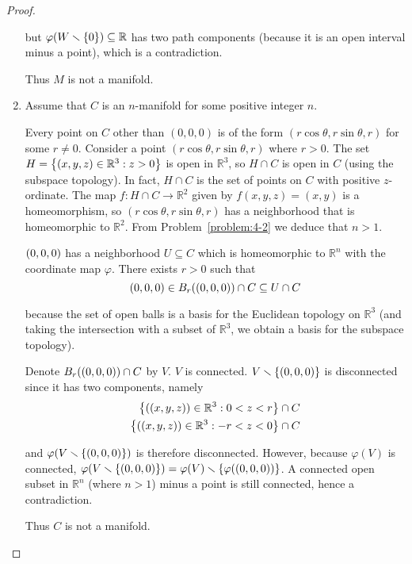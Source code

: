 \begin{proof}
\begin{enumerate}[label={(\alph*)}]
		      but $\varphi(W\smallsetminus\left\{{0}\right\}) \subseteq \mathbb{R}$ has two path components (because it is an open interval minus a point), which is a contradiction.

		      Thus $M$ is not a manifold.
		\item Assume that $C$ is an $n$-manifold for some positive integer $n$.

		      Every point on $C$ other than $(0, 0, 0)$ is of the form $(r\cos\theta, r\sin\theta, r)$ for some $r\ne 0$. Consider a point $(r\cos\theta, r\sin\theta, r)$ where $r > 0$. The set $H = \left\{{ \left({x, y, z}\right) \in \mathbb{R}^{3} : z > 0 }\right\}$ is open in $\mathbb{R}^{3}$, so $H \cap C$ is open in $C$ (using the subspace topology). In fact, $H\cap C$ is the set of points on $C$ with positive $z$-ordinate. The map $f: H\cap C \to \mathbb{R}^{2}$ given by $f(x, y, z) = (x, y)$ is a homeomorphism, so $(r\cos\theta, r\sin\theta, r)$ has a neighborhood that is homeomorphic to $\mathbb{R}^{2}$. From Problem~\ref{problem:4-2} we deduce that $n > 1$.

		      $\left({0, 0, 0}\right)$ has a neighborhood $U \subseteq C$ which is homeomorphic to $\mathbb{R}^{n}$ with the coordinate map $\varphi$. There exists $r > 0$ such that
		      \begin{equation*}
			      \left({0,0,0}\right) \in B_{r}(\left({0,0,0}\right)) \cap C \subseteq U \cap C
		      \end{equation*}

		      because the set of open balls is a basis for the Euclidean topology on $\mathbb{R}^{3}$ (and taking the intersection with a subset of $\mathbb{R}^{3}$, we obtain a basis for the subspace topology).

		      Denote $B_{r}(\left({0,0,0}\right)) \cap C$ by $V$. $V$ is connected. $V\smallsetminus\left\{{\left({0,0,0}\right)}\right\}$ is disconnected since it has two components, namely
		      \begin{equation*}
			      \begin{split}
				      \left\{{\left({(x, y, z)}\right) \in \mathbb{R}^{3} : 0 < z < r}\right\} \cap C \\
				      \left\{{\left({(x, y, z)}\right) \in \mathbb{R}^{3} : -r < z < 0}\right\} \cap C
			      \end{split}
		      \end{equation*}

		      and $\varphi(V \smallsetminus \left\{{\left({0,0,0}\right)}\right\})$ is therefore disconnected. However, because $\varphi(V)$ is connected, $\varphi(V \smallsetminus \left\{{\left({0,0,0}\right)}\right\}) = \varphi(V) \smallsetminus\left\{{\varphi(\left({0,0,0}\right))}\right\}$. A connected open subset in $\mathbb{R}^{n}$ (where $n > 1$) minus a point is still connected, hence a contradiction.

		      Thus $C$ is not a manifold.
	\end{enumerate}
\end{proof}

